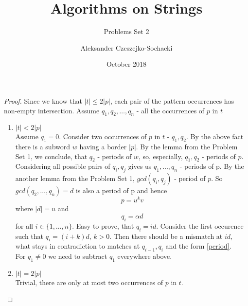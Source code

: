 \documentclass{scrartcl}
\title{Algorithms on Strings}
\subtitle{Problems Set 2}
\author{Aleksander Czeszejko-Sochacki}
\date{October 2018}
\begin{document}
\maketitle
\section{}
  \begin{proof}
    Since we know that $|t| \leq 2|p|$, each pair of the pattern occurrences has
    non-empty intersection.  Assume $q_1, q_2, \dots, q_n$ - all the occurrences of $p$ in $t$
    \begin{enumerate}
        \item $|t| < 2|p|$ \\ 
          Assume $q_1 = 0$. Consider two occurrences of $p$ in $t$ - $q_1, q_2$. 
          By the above fact there is a subword $w$ 
          having a border $|p|$. By the lemma from the Problem Set 1, we conclude, that $q_2$ - periods
          of $w$, so, especially, $q_1, q_2$ - periods of $p$. Considering all possible pairs of $q_i, q_j$ 
          gives us $q_1, \dots, q_n$ - periods of p. By the another lemma from the Problem Set 1,
          $gcd(q_i, q_j)$ - period of $p$. So $gcd(q_2, \dots, q_n) = d$ is also a period of p and hence
          \begin{equation}\label{period}
            p = u^kv
          \end{equation}
          where $|d| = u$ and
          \[q_i = \alpha d\]
          for all $i \in \{1, \dots, n\}$. Easy to prove, that $q_i = id$. Consider the first occurence such
          that $q_i = (i+k)d$, $k > 0$. Then there should be a mismatch at $id$, what stays in contradiction to matches at $q_{i-1},q_i$ and the form \ref{period}. \\
          For $q_1 \neq 0$ we need to subtract $q_1$ everywhere above.
        \item $|t| = 2|p|$ \\
          Trivial, there are only at most two occurrences of $p$ in $t$.
    \end{enumerate}
  \end{proof}
\end{document}

